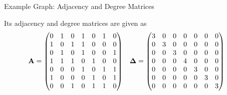 \begin{frame}{Example Graph: Adjacency and Degree Matrices}
\begin{figure}
    \centerline{
	}
 \end{figure}
 \small
    Its adjacency and degree matrices are given as
    \begin{align*}
        \mathbf{A} &= \begin{pmatrix} 0 & 1 & 0 & 1 & 0 & 1 & 0\\
                    1 & 0 & 1 & 1 & 0 & 0 & 0\\
                    0 & 1 & 0 & 1 & 0 & 0 & 1\\
                    1 & 1 & 1 & 0 & 1 & 0 & 0\\
                    0 & 0 & 0 & 1 & 0 & 1 & 1\\
                    1 & 0 & 0 & 0 & 1 & 0 & 1\\
                    0 & 0 & 1 & 0 & 1 & 1 & 0 \end{pmatrix} &
        {\bm \Delta} & = \begin{pmatrix} 
                3 & 0 & 0 & 0 & 0 & 0 & 0\\
                0 & 3 & 0 & 0 & 0 & 0 & 0\\
                0 & 0 & 3 & 0 & 0 & 0 & 0\\
                0 & 0 & 0 & 4 & 0 & 0 & 0\\
                0 & 0 & 0 & 0 & 3 & 0 & 0\\
                0 & 0 & 0 & 0 & 0 & 3 & 0\\
                0 & 0 & 0 & 0 & 0 & 0 & 3 \end{pmatrix}
    \end{align*}
\end{frame}


